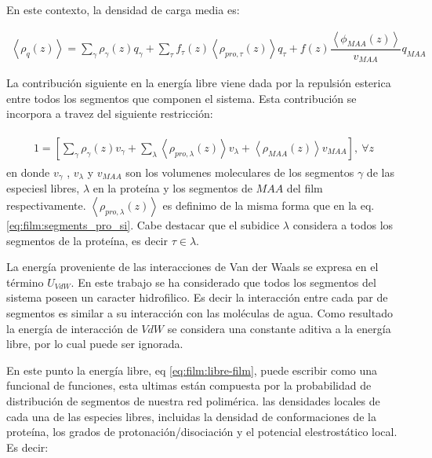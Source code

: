 En este contexto, la densidad de carga media es:

\begin{align}
	\left<\rho_q(z)\right> = \sum_{\gamma } {\rho_\gamma(z) q_\gamma + \sum_\tau{f_\tau(z) \left<\rho_{pro,\tau}(z)\right> q_\tau} +  f(z)\dfrac{\left<\phi_{MAA}(z)\right>}{v_{MAA}}q_{MAA}}
	\label{eq:film:rho_charge}
\end{align}

La contribuci\'on siguiente en la energ\'ia libre viene dada por la repulsi\'on esterica entre  todos los segmentos que componen  el sistema. Esta contribuci\'on se incorpora a travez del siguiente restricci\'on:  

\begin{align}
	\begin{aligned}
		1=  {\left[\sum_{\gamma}\rho_\gamma(z) v_\gamma + \sum_\lambda{\left<\rho_{pro,\lambda}(z)\right>v_\lambda} + \left<\rho_{MAA}(z)\right>v_{MAA} \right]},~ \forall z
	\end{aligned}
	\label{eq:film:constraint}
\end{align}
\noindent en donde $v_\gamma$ , $v_\lambda$ y $v_{MAA}$ son los volumenes moleculares de los segmentos $\gamma$ de las especiesl libres, $\lambda$  en la prote\'ina y los segmentos de $MAA$ del film respectivamente.
$\left<\rho_{pro,\lambda}(z)\right>$ es definimo de la misma forma que en la eq.  \ref{eq:film:segments_pro_si}.
Cabe destacar que el subidice $\lambda$ considera a todos los segmentos de la prote\'ina, es decir $ \tau \in \lambda$.

La energ\'ia proveniente de las interacciones de Van der Waals se expresa en el t\'ermino $U_{VdW}$. En este trabajo se ha considerado que todos los segmentos del sistema poseen un caracter hidrofilico. Es decir la interacci\'on entre cada par de segmentos es similar a su interacci\'on con las mol\'eculas de agua. Como resultado la energ\'ia de interacci\'on de $VdW$ se considera una constante aditiva a la energ\'ia libre, por lo cual puede ser ignorada.

En este punto la energ\'ia libre, eq \ref{eq:film:libre-film}, puede escribir como una funcional de funciones, esta ultimas est\'an compuesta por la probabilidad de distribuci\'on de segmentos de nuestra red polim\'erica. las densidades locales de cada una de las especies libres, incluidas la densidad de conformaciones de la prote\'ina, los grados de protonaci\'on/disociaci\'on y el potencial elestrost\'atico local. Es decir:

